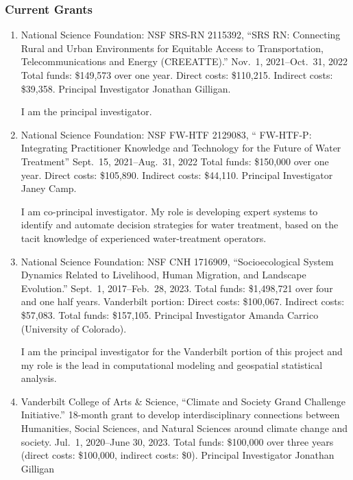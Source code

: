 %
%
\subsubsection{Current Grants}
\begin{enumerate}
%
\item National Science Foundation: NSF SRS-RN 2115392,
``SRS RN: Connecting Rural and Urban Environments for Equitable Access to
Transportation, Telecommunications and Energy (CREEATTE).''
Nov.~1, 2021--Oct.~31, 2022
Total funds: \$149,573 over one year. Direct costs: \$110,215. Indirect costs: \$39,358.
Principal Investigator Jonathan Gilligan.
\begin{credit}
  I am the principal investigator.
\end{credit}
%
\item National Science Foundation: NSF FW-HTF 2129083,
`` FW-HTF-P: Integrating Practitioner Knowledge and Technology for the Future of Water Treatment''
Sept.~15, 2021--Aug.~31, 2022
Total funds: \$150,000 over one year. Direct costs: \$105,890. Indirect costs: \$44,110.
Principal Investigator Janey Camp.
\begin{credit}
I am co-principal investigator. My role is developing expert systems to
identify and automate decision strategies for water treatment, based on the
tacit knowledge of experienced water-treatment operators.
\end{credit}
%
%
\item National Science Foundation: NSF CNH 1716909,
``Socioecological System Dynamics Related to Livelihood, Human Migration, and Landscape Evolution.''
Sept.~1, 2017--Feb.~28, 2023.
Total funds: \$1,498,721 over four and one half years. Vanderbilt portion: Direct costs: \$100,067. Indirect costs: \$57,083. Total funds: \$157,105.
Principal Investigator Amanda Carrico (University of Colorado).
\begin{credit}
I am the principal investigator for the Vanderbilt portion of this project and my role is the lead in computational modeling and geospatial statistical analysis.
\end{credit}
%
\item Vanderbilt College of Arts \& Science,
``Climate and Society Grand Challenge Initiative.''
18-month grant to develop interdisciplinary connections between Humanities, Social Sciences, and Natural Sciences around climate change and society.
Jul.~1, 2020--June 30, 2023.
Total funds: \$100,000 over three years (direct costs: \$100,000,
indirect costs: \$0).
Principal Investigator Jonathan Gilligan

\end{enumerate}
